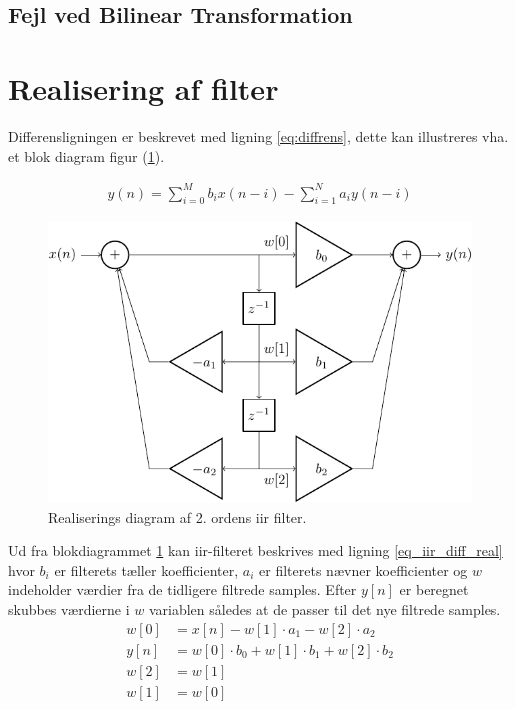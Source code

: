 \subsection{Fejl ved Bilinear Transformation}


\section{Realisering af filter}

Differensligningen er beskrevet med ligning \ref{eq:diffrens}, dette kan illustreres vha. et blok diagram figur (\ref{fig:real_diag}). 

    \begin{align}
    y(n) = \sum\limits_{i=0}^{M} b_i x(n-i) - \sum\limits_{i=1}^N a_i y(n-i)
    \label{eq:diffrens}
    \end{align}


   \begin{figure}[h]
        \centering
        \includegraphics[scale = 0.8]{figure/iir_sos-crop.pdf}
        \caption{Realiserings diagram af 2. ordens iir filter. }    
        \label{fig:real_diag}
    \end{figure}

   Ud fra blokdiagrammet \ref{fig:real_diag} kan iir-filteret beskrives med ligning \ref{eq_iir_diff_real} 
   hvor $b_i$ er filterets tæller koefficienter, $a_i$ er filterets nævner koefficienter og $w$ indeholder 
   værdier fra de tidligere filtrede samples. Efter $y[n]$ er beregnet skubbes værdierne i $w$ variablen  
 således at de passer til det nye filtrede samples. 
    \begin{align}
        w[0] &=x[n] - w[1] \cdot a_1 - w[2] \cdot a_2 \\
        y[n] &= w[0] \cdot b_0 + w[1] \cdot b_1 + w[2] \cdot b_2
        \label{eq:iir_diff_real}
        \\
        w[2] &= w[1] \\
        w[1] &= w[0]
    \end{align}

